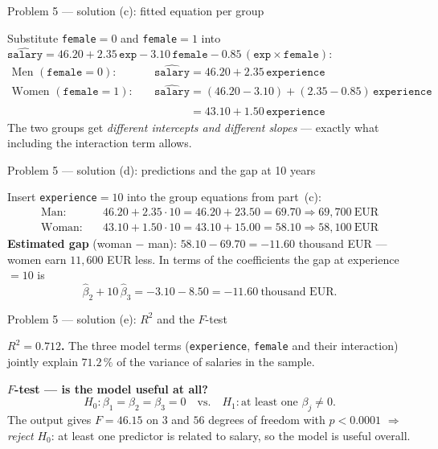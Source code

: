 \documentclass[aspectratio=169,11pt]{beamer}
\begin{document}
\begin{frame}{Problem 5 --- solution (c): fitted equation per group}
  \begin{solutionbox}
    Substitute \texttt{female}$=0$ and \texttt{female}$=1$ into
    $\widehat{\texttt{salary}}=46.20+2.35\,\texttt{exp}-3.10\,\texttt{female}
      -0.85\,(\texttt{exp}\times\texttt{female})$:
    \begin{align*}
      \text{Men } (\texttt{female}=0):\quad
        & \widehat{\texttt{salary}} = 46.20 + 2.35\,\texttt{experience}\\
      \text{Women } (\texttt{female}=1):\quad
        & \widehat{\texttt{salary}} = (46.20-3.10) + (2.35-0.85)\,\texttt{experience}\\
        & \phantom{\widehat{\texttt{salary}}} = 43.10 + 1.50\,\texttt{experience}
    \end{align*}
    The two groups get \emph{different intercepts and different slopes} --- exactly what including
    the interaction term allows.
  \end{solutionbox}
\end{frame}

\begin{frame}{Problem 5 --- solution (d): predictions and the gap at 10 years}
  \begin{solutionbox}
    Insert \texttt{experience}$=10$ into the group equations from part~(c):
    \begin{align*}
      \text{Man:}\quad & 46.20 + 2.35\cdot 10 = 46.20+23.50 = 69.70 \Rightarrow 69{,}700\ \text{EUR}\\
      \text{Woman:}\quad & 43.10 + 1.50\cdot 10 = 43.10+15.00 = 58.10 \Rightarrow 58{,}100\ \text{EUR}
    \end{align*}
    \textbf{Estimated gap} (woman $-$ man): $58.10-69.70=-11.60$ thousand EUR --- women earn
    $11{,}600$ EUR less. In terms of the coefficients the gap at experience $=10$ is
    \[
      \hat\beta_2+10\,\hat\beta_3=-3.10-8.50=-11.60\ \text{thousand EUR}.
    \]
  \end{solutionbox}
\end{frame}

\begin{frame}{Problem 5 --- solution (e): $R^2$ and the $F$-test}
  \begin{solutionbox}
    \textbf{$R^2=0.712$.} The three model terms (\texttt{experience}, \texttt{female} and their
    interaction) jointly explain $71.2\,\%$ of the variance of salaries in the sample.
    \medskip

    \textbf{$F$-test --- is the model useful at all?}
    \[
      H_0\colon \beta_1=\beta_2=\beta_3=0 \quad\text{vs.}\quad
      H_1\colon \text{at least one } \beta_j\neq 0.
    \]
    The output gives $F=46.15$ on $3$ and $56$ degrees of freedom with $p<0.0001$
    $\Rightarrow$ \emph{reject} $H_0$: at least one predictor is related to salary, so the model
    is useful overall.
  \end{solutionbox}
\end{frame}
\end{document}
